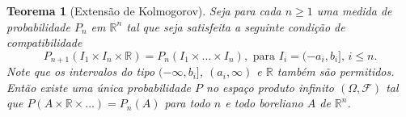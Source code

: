 \documentclass[reqno, draft]{book}
\newcommand*\1{\mathds{1}}
\newtheorem{theorem}{Teorema}[section]
\begin{document}
\begin{theorem}[Extensão de Kolmogorov]
  \label{t:extens_kolmog}
  Seja para cada $n \geq 1$ uma medida de probabilidade $P_n$ em $\mathbb{R}^n$ tal que seja satisfeita a seguinte condição de compatibilidade 
  \begin{equation}
    \label{e:consist_kolmog}
    P_{n+1} (I_1 \times I_n \times \mathbb{R}) = P_n (I_1 \times \dots \times I_n), \text{ para $I_i = (-a_i, b_i]$, $i \leq n$}.
  \end{equation}
  Note que os intervalos do tipo $(-\infty, b_i]$, $(a_i, \infty)$ e $\mathbb{R}$ também são permitidos.
  Então existe uma única probabilidade $P$ no espaço produto infinito $(\Omega, \mathcal{F})$ tal que $P(A \times \mathbb{R} \times \dots) = P_n (A)$ para todo $n$ e todo boreliano $A$ de $\mathbb{R}^n$.
\end{theorem}

\end{document}

